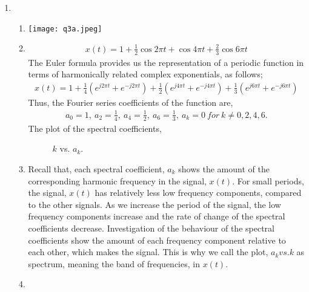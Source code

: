 \documentclass[10pt,a4paper, margin=1in]{article}
\begin{document}
\begin{enumerate}
\item %
    \begin{enumerate}
    \item %
    \texttt{[image: q3a.jpeg]}
    \item %
    \begin{align*}
        x(t) = 1 + \frac{1}{2}\cos{2\pi t} + \cos{4\pi t} + \frac{2}{3} \cos{6\pi t}
    \end{align*}
    The Euler formula provides us the representation of a periodic function in terms of harmonically related complex exponentials, as follows;
    \begin{align*}
        x(t) = 1 + \frac{1}{4}(e^{j2\pi t} + e^{-j2\pi t})+\frac{1}{2}(e^{j4\pi t} + e^{-j4\pi t})+\frac{1}{3}(e^{j6\pi t} + e^{-j6\pi t})
    \end{align*}
    Thus, the Fourier series coefficients of the function are,
    \begin{align*}
        a_0 = 1,\ a_2 = \frac{1}{4},\ a_4 = \frac{1}{2},\ a_6 = \frac{1}{3},\ a_k = 0 \ for \ k\neq 0,2,4,6.
    \end{align*}
    The plot of the spectral coefficients,
    \begin{figure} [h!]
        \centering
        \caption{$k$ vs. $a_k$.}
        \label{fig:q2}
    \end{figure}
    \item %
    Recall that, each spectral coefficient, $a_k$ shows the amount of the corresponding harmonic frequency in the signal, $x(t)$. For small periods, the signal, $x(t)$ has relatively less low frequency components, compared to the other signals. As we increase the period of the signal, the low frequency components increase and the rate of change of the spectral coefficients decrease. Investigation of the behaviour of the spectral coefficients show the amount of each frequency component relative to each other, which makes the signal. This is why we call the plot, $a_k vs. k$ as spectrum, meaning the band of frequencies, in $x(t)$.
    \item %
    \end{enumerate}


\end{enumerate}
\end{document}
